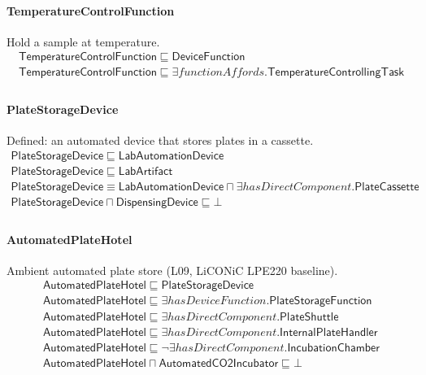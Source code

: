 \documentclass[10pt]{article}
\begin{document}
\paragraph{TemperatureControlFunction} Hold a sample at temperature.
\[\begin{array}{l}
\mathsf{TemperatureControlFunction} \sqsubseteq  \mathsf{DeviceFunction} \\
\mathsf{TemperatureControlFunction} \sqsubseteq  \exists \mathit{functionAffords}.\mathsf{TemperatureControllingTask} \\
\end{array}\]
\paragraph{PlateStorageDevice} Defined: an automated device that stores plates in a cassette.
\[\begin{array}{l}
\mathsf{PlateStorageDevice} \sqsubseteq  \mathsf{LabAutomationDevice} \\
\mathsf{PlateStorageDevice} \sqsubseteq  \mathsf{LabArtifact} \\
\mathsf{PlateStorageDevice} \equiv  \mathsf{LabAutomationDevice} \sqcap  \exists \mathit{hasDirectComponent}.\mathsf{PlateCassette} \\
\mathsf{PlateStorageDevice} \sqcap  \mathsf{DispensingDevice} \sqsubseteq  \bot  \\
\end{array}\]
\paragraph{AutomatedPlateHotel} Ambient automated plate store (L09, LiCONiC LPE220 baseline).
\[\begin{array}{l}
\mathsf{AutomatedPlateHotel} \sqsubseteq  \mathsf{PlateStorageDevice} \\
\mathsf{AutomatedPlateHotel} \sqsubseteq  \exists \mathit{hasDeviceFunction}.\mathsf{PlateStorageFunction} \\
\mathsf{AutomatedPlateHotel} \sqsubseteq  \exists \mathit{hasDirectComponent}.\mathsf{PlateShuttle} \\
\mathsf{AutomatedPlateHotel} \sqsubseteq  \exists \mathit{hasDirectComponent}.\mathsf{InternalPlateHandler} \\
\mathsf{AutomatedPlateHotel} \sqsubseteq  \neg \exists \mathit{hasDirectComponent}.\mathsf{IncubationChamber} \\
\mathsf{AutomatedPlateHotel} \sqcap  \mathsf{AutomatedCO2Incubator} \sqsubseteq  \bot  \\
\end{array}\]
\end{document}
